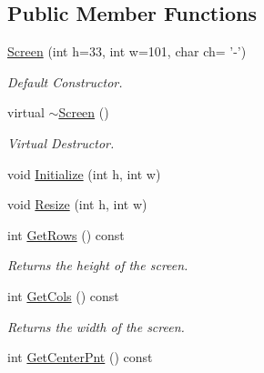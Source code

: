 \subsection*{Public Member Functions}
\begin{DoxyCompactItemize}
\item 
\hyperlink{classScreen_a932b81c3d221d644cc40ffe9003515a5}{Screen} (int h=33, int w=101, char ch= '-\/')
\begin{DoxyCompactList}\small\item\em Default Constructor. \end{DoxyCompactList}\item 
virtual \hyperlink{classScreen_a4243bc17596af96415b09ac48205676d}{$\sim$\-Screen} ()
\begin{DoxyCompactList}\small\item\em Virtual Destructor. \end{DoxyCompactList}\item 
void \hyperlink{classScreen_a455b38b1ac9b18bd67ecd2e056dff909}{Initialize} (int h, int w)
\item 
void \hyperlink{classScreen_a11f9842c836301989f7c3d84eb043700}{Resize} (int h, int w)
\item 
\hypertarget{classScreen_aa12cc4ea36f5d2ac98b3c7334616acbc}{int \hyperlink{classScreen_aa12cc4ea36f5d2ac98b3c7334616acbc}{Get\-Rows} () const }\label{classScreen_aa12cc4ea36f5d2ac98b3c7334616acbc}

\begin{DoxyCompactList}\small\item\em Returns the height of the screen. \end{DoxyCompactList}\item 
\hypertarget{classScreen_a223cd8821b2b8006c61545ff41aa0091}{int \hyperlink{classScreen_a223cd8821b2b8006c61545ff41aa0091}{Get\-Cols} () const }\label{classScreen_a223cd8821b2b8006c61545ff41aa0091}

\begin{DoxyCompactList}\small\item\em Returns the width of the screen. \end{DoxyCompactList}\item 
\hypertarget{classScreen_a95daa612c5ec6a8018b89cfc2d785e27}{int \hyperlink{classScreen_a95daa612c5ec6a8018b89cfc2d785e27}{Get\-Center\-Pnt} () const }\label{classScreen_a95daa612c5ec6a8018b89cfc2d785e27}


\end{DoxyCompactItemize}
